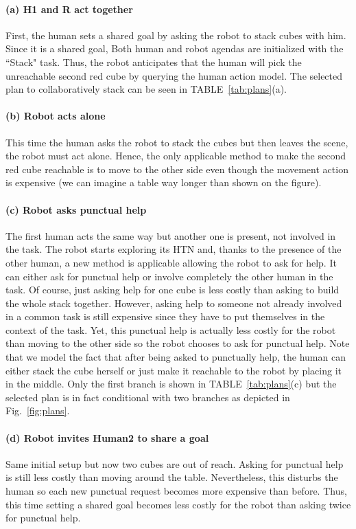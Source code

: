\paragraph{(a) H1 and R act together}
First, the human sets a shared goal by asking the robot to stack cubes with him. Since it is a shared goal, Both human and robot agendas are initialized with the ``Stack" task. Thus, the robot anticipates that the human will pick the unreachable second red cube by querying the human action model. The selected plan to collaboratively stack can be seen in TABLE~\ref{tab:plans}(a). 

\paragraph{(b) Robot acts alone}
This time the human asks the robot to stack the cubes but then leaves the scene, the robot must act alone. Hence, the only applicable method to make the second red cube reachable is to move to the other side even though the movement action is expensive (we can imagine a table way longer than shown on the figure).

\paragraph{(c) Robot asks punctual help}
The first human acts the same way but another one is present, not involved in the task. The robot starts exploring its HTN and, thanks to the presence of the other human, a new method is applicable allowing the robot to ask for help. It can either ask for punctual help or involve completely the other human in the task. Of course, just asking help for one cube is less costly than asking to build the whole stack together. However, asking help to someone not already involved in a common task is still expensive since they have to put themselves in the context of the task. Yet, this punctual help is actually less costly for the robot than moving to the other side so the robot chooses to ask for punctual help. Note that we model the fact that after being asked to punctually help, the human can either stack the cube herself or just make it reachable to the robot by placing it in the middle. Only the first branch is shown in TABLE~\ref{tab:plans}(c) but the selected plan is in fact conditional with two branches as depicted in Fig.~\ref{fig:plans}.

\paragraph{(d) Robot invites Human2 to share a goal}
Same initial setup but now two cubes are out of reach. Asking for punctual help is still less costly than moving around the table. Nevertheless, this disturbs the human so each new punctual request becomes more expensive than before. Thus, this time setting a shared goal becomes less costly for the robot than asking twice for punctual help.

